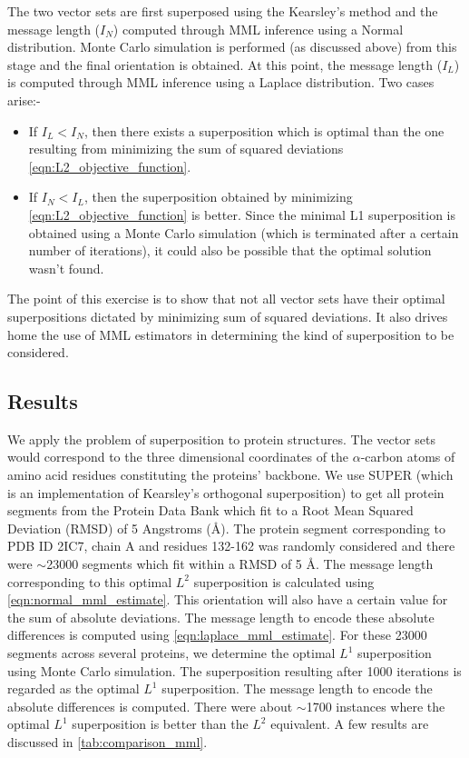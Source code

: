 \documentclass[wcp]{jmlr}
\begin{document}
The two vector sets are first superposed using the Kearsley's method and the message
length ($I_{N}$) computed through MML inference using a Normal distribution. 
Monte Carlo simulation is performed (as discussed above) from this stage and
the final orientation is obtained. At this point, the message length ($I_L$) is
computed through MML inference using a Laplace distribution. Two cases arise:-
\begin{itemize}
\item If $I_L < I_N$, then there exists a superposition which is optimal than the
one resulting from minimizing the sum of squared deviations \eqref{eqn:L2_objective_function}.
\item If $I_N < I_L$, then the superposition obtained by minimizing
\eqref{eqn:L2_objective_function} is better. Since the minimal L1 superposition
is obtained using a Monte Carlo simulation (which is terminated after a certain number
of iterations), it could also be possible that the optimal solution wasn't found.
\end{itemize}

The point of this exercise is to show that not all vector sets have their
optimal superpositions dictated by minimizing sum of squared deviations. It also drives
home the use of MML estimators in determining the kind of superposition to be
considered. 

\subsection*{Results}
We apply the problem of superposition to protein structures. The vector sets would
correspond to the three dimensional coordinates of the $\alpha$-carbon atoms of 
amino acid residues constituting the proteins' backbone. We use SUPER \citep{super}
(which is an implementation of Kearsley's orthogonal superposition)
to get all protein segments from the Protein Data Bank which fit to a Root Mean 
Squared Deviation (RMSD) of 5 Angstroms (\AA). The protein segment corresponding
to PDB ID 2IC7, chain A and residues 132-162 was randomly
considered and there were $\sim$23000 segments which fit within a RMSD of 5 \AA. 
The message length corresponding to this optimal $L^2$ superposition is calculated
using \eqref{eqn:normal_mml_estimate}. This orientation will also have a certain
value for the sum of absolute deviations. The message length to encode these
absolute differences is computed using \eqref{eqn:laplace_mml_estimate}.
For these 23000 segments across several proteins, we determine the optimal $L^1$ superposition
using Monte Carlo simulation. The superposition resulting after 1000 iterations
is regarded as the optimal $L^1$ superposition. The message length to encode the
absolute differences is computed. There were about $\sim$1700 instances where the
optimal $L^1$ superposition is better than the $L^2$ equivalent. A few 
results are discussed in \autoref{tab:comparison_mml}. 
\end{document}
